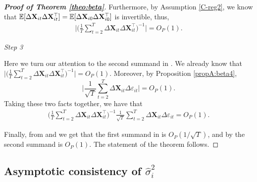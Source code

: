 \documentclass[a4paper,12pt]{article}
\makeatletter
\renewcommand{\eqref}[1]{\tagform@{\ref{#1}}}
\makeatother
\begin{document}
\begin{proof}[\textnormal{\textbf{Proof of Theorem \ref{theo:beta}}}]
Furthermore, by Assumption \ref{C-reg2}, we know that $\mathbb{E} [\Delta \mathbf{X}_{it} \Delta \mathbf{X}_{it}^\top] = \mathbb{E} [\Delta \mathbf{X}_{i0} \Delta \mathbf{X}_{i0}^\top]$ is invertible, thus, 
\begin{align}\label{theo-regs-proof-7}
\Bigg|  \Big(\frac{1}{T}\sum_{t=2}^T\Delta \mathbf{X}_{it} \Delta \mathbf{X}_{it}^\top\Big)^{-1}\Bigg| = O_P(1).
\end{align}


\vspace{2mm}
{\it Step 3}

Here we turn our attention to the second summand in \eqref{theo:beta:proof1}. We already know that $\Big|  \big(\frac{1}{T}\sum_{t=2}^T\Delta \mathbf{X}_{it} \Delta \mathbf{X}_{it}^\top\big)^{-1}\Big| = O_P(1)$. Moreover, by Proposition \ref{propA:beta4}, 
\[ \bigg| \frac{1}{\sqrt{T}}\sum_{t=2}^T \Delta \mathbf{X}_{it}\Delta \varepsilon_{it} \bigg| = O_P(1).
\]
Taking these two facts together, we have that 
\begin{align}\label{theo:beta:proof8}
\Big(\frac{1}{T} \sum_{t=2}^T \Delta \mathbf{X}_{it} \Delta \mathbf{X}_{it}^\top \Big)^{-1}\frac{1}{\sqrt{T}} \sum_{t=2}^T \Delta \mathbf{X}_{it} \Delta \varepsilon_{it} = O_P(1).
\end{align}

Finally, from \eqref{theo-regs-proof-6} and \eqref{theo-regs-proof-7} we get that the first summand in \eqref{theo:beta:proof1} is $O_P(1/\sqrt{T})$, and by \eqref{theo:beta:proof8} the second summand is $O_P(1)$. The statement of the theorem follows.
\end{proof}

\subsection{Asymptotic consistency of $\widehat{\sigma}_i^2$}\label{subsec:app:lrv}
\end{document}
